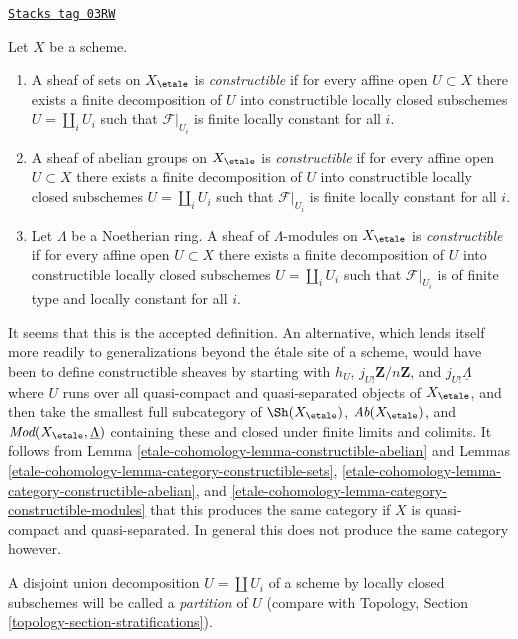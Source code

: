 \begin{definition}[Constructible]
\label{etale-cohomology-definition-constructible}
\href{https://stacks.math.columbia.edu/tag/03RW}{\texttt{Stacks tag 03RW}}

Let $X$ be a scheme.
\begin{enumerate}
\item A sheaf of sets on $X_\etale$ is {\it constructible}
if for every affine open $U \subset X$ there exists a finite decomposition
of $U$ into constructible locally closed subschemes $U = \coprod_i U_i$
such that $\mathcal{F}|_{U_i}$ is finite locally constant for all $i$.
\item A sheaf of abelian groups on $X_\etale$ is {\it constructible}
if for every affine open $U \subset X$ there exists a finite decomposition
of $U$ into constructible locally closed subschemes $U = \coprod_i U_i$
such that $\mathcal{F}|_{U_i}$ is finite locally constant for all $i$.
\item Let $\Lambda$ be a Noetherian ring. A sheaf of $\Lambda$-modules
on $X_\etale$ is {\it constructible} if for every affine open
$U \subset X$ there exists a finite decomposition
of $U$ into constructible locally closed subschemes
$U = \coprod_i U_i$ such that
$\mathcal{F}|_{U_i}$ is of finite type and locally constant for all $i$.
\end{enumerate}
\end{definition}

It seems that this is the accepted definition. An alternative, which lends
itself more readily to generalizations beyond the \'etale site of a scheme,
would have been to define constructible sheaves by starting with
$h_U$, $j_{U!}\mathbf{Z}/n\mathbf{Z}$, and $j_{U!}\underline{\Lambda}$
where $U$ runs over all quasi-compact and quasi-separated objects
of $X_\etale$, and then take the smallest full subcategory of
$\Sh(X_\etale)$, $\textit{Ab}(X_\etale)$, and
$\textit{Mod}(X_\etale, \underline{\Lambda})$ containing these
and closed under finite limits and colimits. It follows from
Lemma \ref{etale-cohomology-lemma-constructible-abelian}
and
Lemmas \ref{etale-cohomology-lemma-category-constructible-sets},
\ref{etale-cohomology-lemma-category-constructible-abelian}, and
\ref{etale-cohomology-lemma-category-constructible-modules}
that this produces the same category if $X$ is quasi-compact and
quasi-separated. In general this does not produce the same
category however.

\medskip\noindent
A disjoint union decomposition $U = \coprod U_i$ of a scheme by
locally closed subschemes will be called a {\it partition} of $U$
(compare with Topology, Section \ref{topology-section-stratifications}).

